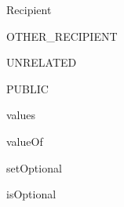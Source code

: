 \begin{jdclass}[class]{Recipient}
\begin{jdfield}{OTHER\_RECIPIENT}
\end{jdfield}
\begin{jdfield}{UNRELATED}
\jdpublic \jdfinal \jdstatic 
{}
\end{jdfield}
\begin{jdfield}{PUBLIC}
\jdpublic \jdfinal \jdstatic 
{}
\end{jdfield}
\begin{jdmethod}{values}
\jdpublic \jdstatic 
{}
\end{jdmethod}
\begin{jdmethod}{valueOf}
\jdpublic \jdstatic 
{}
\end{jdmethod}
\begin{jdmethod}{setOptional}
\jdpublic 
{}
\end{jdmethod}
\begin{jdmethod}{isOptional}
\jdpublic 
{}
\end{jdmethod}
\end{jdclass}

